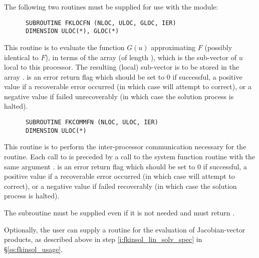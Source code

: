 \begin{Steps}
  The following two routines must be supplied for use with the {\kinbbdpre}
  module:
\begin{verbatim}
      SUBROUTINE FKLOCFN (NLOC, ULOC, GLOC, IER)
      DIMENSION ULOC(*), GLOC(*)
\end{verbatim}
  This routine is to evaluate the function $G(u)$ approximating $F$
  (possibly identical to $F$), in terms of the array
   (of length ), which is the sub-vector
  of $u$ local to this processor.  The resulting (local) sub-vector
  is to be stored in the array .
   is an error return flag which should be set to $0$ if successful,
  a positive value if a recoverable error occurred (in which case {\kinsol} will
  attempt to correct), or a negative value if  failed unrecoverably
  (in which case the solution process is halted).

\begin{verbatim}
      SUBROUTINE FKCOMMFN (NLOC, ULOC, IER)
      DIMENSION ULOC(*)
\end{verbatim}
  This routine is to perform the inter-processor communication necessary
  for the  routine.
  Each call to  is preceded by a call to the system function
  routine  with the same argument .
   is an error return flag which should be set to $0$ if successful,
  a positive value if a recoverable error occurred (in which case {\kinsol} will
  attempt to correct), or a negative value if  failed recoverably
  (in which case the solution process is halted).

  {\warn}The subroutine  must be supplied even if it is not needed
  and must return .

  Optionally, the user can supply a routine  for the evaluation of
  Jacobian-vector products, as described above in step \ref{i:fkinsol_lin_solv_spec}
  in \S\ref{ss:fkinsol_usage}.

\end{Steps}
